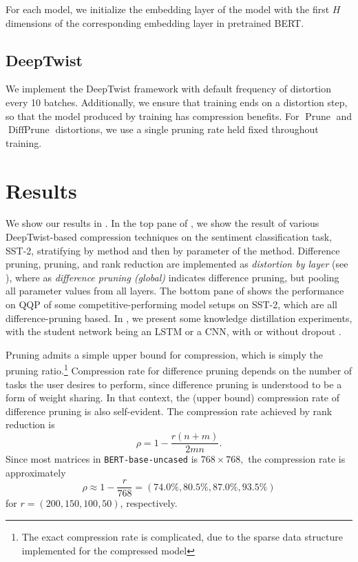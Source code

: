 \documentclass[10pt]{article}
\newcommand{\prune}{\operatorname{Prune}}
\newcommand{\diffprune}{\operatorname{DiffPrune}}
\begin{document}
For each model, we initialize the embedding layer of the model with the
first $H$ dimensions of the corresponding embedding layer in pretrained
BERT. 

\subsection{DeepTwist}
We implement the DeepTwist framework with default frequency of distortion
every 10 batches. Additionally, we ensure that training ends on a
distortion step, so that the model produced by training has compression
benefits. For $\prune$ and $\diffprune$ distortions, we use a single
pruning rate held fixed throughout training. 

\section{Results}

We show our results in . In the top
pane of , we show the result of various
DeepTwist-based compression techniques on the sentiment classification task,
SST-2, stratifying by method and then by parameter of the method. Difference
pruning, pruning, and rank reduction are implemented as \emph{distortion by
layer} (see ), where as \emph{difference pruning (global)}
indicates difference pruning, but pooling all parameter values from all layers.
The bottom pane of  shows the performance on QQP of
some competitive-performing model setups on SST-2, which are all
difference-pruning based. In , we present some knowledge
distillation experiments, with the student network being an LSTM or a CNN, with
or without dropout \citep{kim2014convolutional}. 

Pruning admits a simple upper bound for compression, which is simply the
pruning ratio.\footnote{The exact compression rate is complicated, due to
the sparse data structure implemented for the compressed model} Compression
rate for difference pruning depends on the number of tasks the user
desires to perform, since difference pruning is understood to be a form of
weight sharing. In that context, the (upper bound) compression rate of
difference
pruning
is also self-evident. The compression rate achieved by rank reduction is \[
\rho = 1 - \frac{r(n+m)}{2mn}.
\]
Since most matrices in \texttt{BERT-base-uncased} is $768\times 768,$ the
compression rate is approximately \[
\rho \approx 1 - \frac{r}{768} = (74.0\%,
80.5\%,
87.0\%,
93.5\%)
\]
for $r = (200,150,100,50)$, respectively.
 
\end{document}
